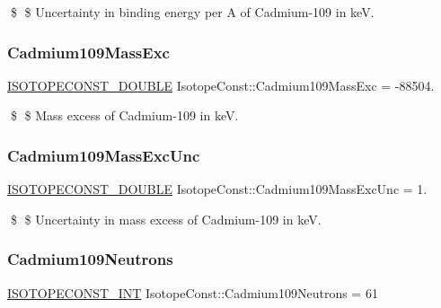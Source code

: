 \$ \$ Uncertainty in binding energy per A of Cadmium-\/109 in keV. \mbox{\label{group___isotope_const-_cadmium-_cd109_ga7372c9a80e33a6d467d3018009fa2d01}} 
\subsubsection{\texorpdfstring{Cadmium109\+Mass\+Exc}{Cadmium109MassExc}}
{\footnotesize\ttfamily \mbox{\hyperlink{group___isotope_const-_macros_ga8f45a7272ce02c0b4c65c44636ed719a}{I\+S\+O\+T\+O\+P\+E\+C\+O\+N\+S\+T\+\_\+\+D\+O\+U\+B\+LE}} Isotope\+Const\+::\+Cadmium109\+Mass\+Exc = -\/88504.}

\$ \$ Mass excess of Cadmium-\/109 in keV. \mbox{\label{group___isotope_const-_cadmium-_cd109_gafd7232696236eeddde4285c5b6ab2d49}} 
\subsubsection{\texorpdfstring{Cadmium109\+Mass\+Exc\+Unc}{Cadmium109MassExcUnc}}
{\footnotesize\ttfamily \mbox{\hyperlink{group___isotope_const-_macros_ga8f45a7272ce02c0b4c65c44636ed719a}{I\+S\+O\+T\+O\+P\+E\+C\+O\+N\+S\+T\+\_\+\+D\+O\+U\+B\+LE}} Isotope\+Const\+::\+Cadmium109\+Mass\+Exc\+Unc = 1.}

\$ \$ Uncertainty in mass excess of Cadmium-\/109 in keV. \mbox{\label{group___isotope_const-_cadmium-_cd109_ga454cd6fe4c7e9c012d7ee8e01e043310}} 
\subsubsection{\texorpdfstring{Cadmium109\+Neutrons}{Cadmium109Neutrons}}
{\footnotesize\ttfamily \mbox{\hyperlink{group___isotope_const-_macros_ga5f18360b3e99483a35c32d789e62621c}{I\+S\+O\+T\+O\+P\+E\+C\+O\+N\+S\+T\+\_\+\+I\+NT}} Isotope\+Const\+::\+Cadmium109\+Neutrons = 61}

